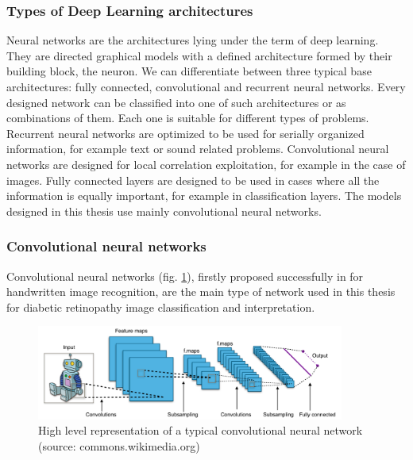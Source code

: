 \subsubsection{Types of Deep Learning architectures}

Neural networks are the architectures lying under the term of deep learning. They are directed graphical models with a defined architecture formed by their building block, the neuron. We can differentiate between three typical base architectures: fully connected, convolutional and recurrent neural networks. Every designed network can be classified into one of such architectures or as combinations of them. Each one is suitable for different types of problems. Recurrent neural networks are optimized to be used for serially organized information, for example text or sound related problems. Convolutional neural networks are designed for local correlation exploitation, for example in the case of images. Fully connected layers are designed to be used in cases where all the information is equally important, for example in classification layers. The models designed in this thesis use mainly convolutional neural networks.

\subsubsection{Convolutional neural networks}

Convolutional neural networks (fig. \ref{back:fig:cnn}), firstly proposed successfully in \citep{lecun1989backpropagation} for handwritten image recognition, are the main type of network used in this thesis for diabetic retinopathy image classification and interpretation.

\begin{figure}[!htb]
	\centering
	\includegraphics[width=0.9\textwidth]{Figures/chapter_background/typical_cnn.png}
	\caption[High level representation of a typical convolutional neural network]{High level representation of a typical convolutional neural network (source: commons.wikimedia.org)}
	\label{back:fig:cnn}
\end{figure}

